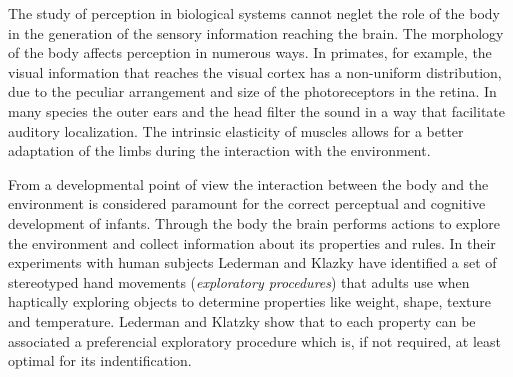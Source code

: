 
The study of perception in biological systems cannot neglet the role of the body in the generation of the sensory information reaching the brain.
The morphology of the body affects perception in numerous ways. In primates, for example, the visual information that reaches the visual cortex has a non-uniform distribution, due to the peculiar arrangement and size of the photoreceptors in the retina. In many species the outer ears and the head filter the sound in a way that facilitate auditory localization. The intrinsic elasticity of muscles allows for a better adaptation of the limbs during the interaction with the environment.

From a developmental point of view the interaction between the body and the environment is considered paramount for the correct perceptual and cognitive development of infants. 
Through the body the brain performs actions to explore the environment and collect information about its properties and rules. In their experiments with human subjects Lederman and Klazky \cite{lederman87hand} have identified a set of stereotyped hand movements ({\it exploratory procedures}) that adults use when haptically exploring objects to determine properties like weight, shape, texture and temperature. Lederman and Klatzky show that to each property can be associated a preferencial exploratory procedure which is, if not required, at least optimal for its indentification. 

